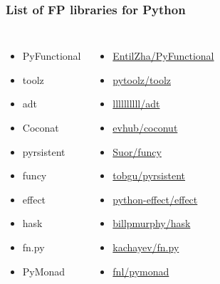\documentclass[18pt, compress, aspectratio=169]{beamer}
\begin{document}
\fontsize{14pt}{15}\selectfont
\begin{frame}
    \frametitle{List of FP libraries for Python}
    \vspace{-35pt}
    \begin{columns}[T,onlytextwidth]
        \begin{itemize}[label={\MVRightarrow}]
            \item PyFunctional
            \item toolz
            \item adt
            \item Coconat
            \item pyrsistent
            \item funcy
            \item effect
            \item hask
            \item fn.py
            \item PyMonad
        \end{itemize}

        \begin{itemize}[label={}]
            \item \href{github.com/EntilZha/PyFunctional}{EntilZha/PyFunctional}
            \item \href{github.com/pytoolz/toolz}{pytoolz/toolz}
            \item \href{github.com/llllllllll/adt}{llllllllll/adt}
            \item \href{github.com/evhub/coconut}{evhub/coconut}
            \item \href{github.com/Suor/funcy}{Suor/funcy}
            \item \href{github.com/tobgu/pyrsistent}{tobgu/pyrsistent}
            \item \href{github.com/python-effect/effect}{python-effect/effect}
            \item \href{github.com/billpmurphy/hask}{billpmurphy/hask}
            \item \href{github.com/kachayev/fn.py}{kachayev/fn.py}
            \item \href{github.com/fnl/pymonad}{fnl/pymonad}
        \end{itemize}

    \end{columns}
\end{frame}
\fontsize{17pt}{18}\selectfont
\end{document}
